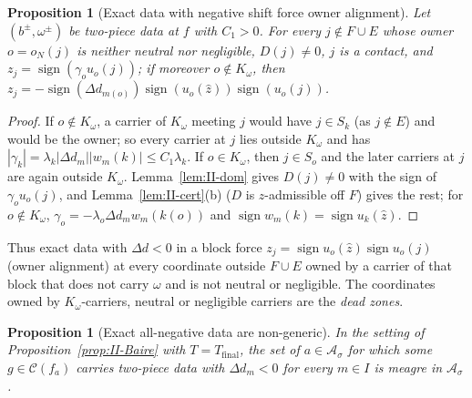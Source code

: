 \documentclass[10pt]{amsart}
\newtheorem{proposition}[theorem]{Proposition}
\theoremstyle{definition}
\theoremstyle{remark}
\newcommand{\sgn}{\operatorname{sign}}
\newcommand{\Cset}{\mathcal C}
\newcommand{\zh}{\hat z}
\begin{document}
\begin{proposition}[Exact data with negative shift force owner alignment]\label{prop:II-align}
Let $(b^\pm,\omega^\pm)$ be two-piece data at $f$ with $C_1>0$.  For every
$j\notin F\cup E$ whose owner $o=o_N(j)$ is neither neutral nor negligible,
$D(j)\ne0$, $j$ is a contact, and $z_j=\sgn(\gamma_ou_o(j))$; if moreover $o\notin
K_\omega$, then $z_j=-\sgn(\Delta d_{m(o)})\sgn(u_o(\zh))\sgn(u_o(j))$.
\end{proposition}

\begin{proof}
If $o\notin K_\omega$, a carrier of $K_\omega$ meeting $j$ would have $j\in S_k$
(as $j\notin E$) and would be the owner; so every carrier at $j$ lies outside
$K_\omega$ and has $|\gamma_k|=\lambda_k|\Delta d_m||w_m(k)|\le C_1\lambda_k$.  If $o\in
K_\omega$, then $j\in S_o$ and the later carriers at $j$ are again outside
$K_\omega$.  Lemma~\ref{lem:II-dom} gives $D(j)\ne0$ with the sign of $\gamma_o
u_o(j)$, and Lemma~\ref{lem:II-cert}(b) ($D$ is $z$-admissible off $F$) gives the
rest; for $o\notin K_\omega$, $\gamma_o=-\lambda_o\Delta d_mw_m(k(o))$ and $\sgn w_m(k)=
\sgn u_k(\zh)$.
\end{proof}

Thus exact data with $\Delta d<0$ in a block force $z_j=\sgn u_o(\zh)\sgn u_o(j)$
(owner alignment) at every coordinate outside $F\cup E$ owned by a carrier of
that block that does not carry $\omega$ and is not neutral or negligible.  The
coordinates owned by $K_\omega$-carriers, neutral or negligible carriers are the
\emph{dead zones}.

\begin{proposition}[Exact all-negative data are non-generic]\label{prop:II-R5}
In the setting of Proposition~\textup{\ref{prop:II-Baire}} with
$T=T_{\mathrm{final}}$, the set of $a\in\mathcal A_\sigma$ for which some
$g\in\Cset(f_a)$ carries two-piece data with $\Delta d_m<0$ for every $m\in I$ is
meagre in $\mathcal A_\sigma$.
\end{proposition}
\end{document}
